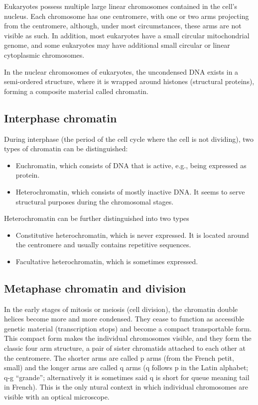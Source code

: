 Eukaryotes possess multiple large linear chromosomes contained in the cell's nucleus. Each chromosome has one centromere, with one or two arms projecting from the centromere, although, under most circumstances, these arms are not visible as such. In addition, most eukaryotes have a small circular mitochondrial genome, and some eukaryotes may have additional small circular or linear cytoplasmic chromosomes.

In the nuclear chromosomes of eukaryotes, the uncondensed DNA exists in a semi-ordered structure, where it is wrapped around histones (structural proteins), forming a composite material called chromatin.

\hypertarget{interphase-chromatin}{%
\subsection{Interphase chromatin}\label{interphase-chromatin}}

During interphase (the period of the cell cycle where the cell is not dividing), two types of chromatin can be distinguished:

\begin{itemize}
\tightlist
\item
  Euchromatin, which consists of DNA that is active, e.g., being expressed as protein.
\item
  Heterochromatin, which consists of mostly inactive DNA. It seems to serve structural purposes during the chromosomal stages.
\end{itemize}

Heterochromatin can be further distinguished into two types

\begin{itemize}
\tightlist
\item
  Constitutive heterochromatin, which is never expressed. It is located around the centromere and usually contains repetitive sequences.
\item
  Facultative heterochromatin, which is sometimes expressed.
\end{itemize}

\hypertarget{metaphase-chromatin-and-division}{%
\subsection{Metaphase chromatin and division}\label{metaphase-chromatin-and-division}}

In the early stages of mitosis or meiosis (cell division), the chromatin double helices become more and more condensed. They cease to function as accessible genetic material (transcription stops) and become a compact transportable form. This compact form makes the individual chromosomes visible, and they form the classic four arm structure, a pair of sister chromatids attached to each other at the centromere. The shorter arms are called p arms (from the French petit, small) and the longer arms are called q arms (q follows p in the Latin alphabet; q-g ``grande''; alternatively it is sometimes said q is short for queue meaning tail in French). This is the only ntural context in which individual chromosomes are visible with an optical microscope.

